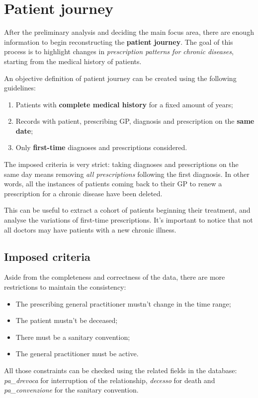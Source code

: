 \chapter{Patient journey}
After the preliminary analysis and deciding the main focus area, there are enough information to begin reconstructing the \textbf{patient journey}. The goal of this process is to highlight changes in \textit{prescription patterns for chronic diseases}, starting from the medical history of patients.

An objective definition of patient journey can be created using the following guidelines:
\begin{enumerate}
	\item Patients with \textbf{complete medical history} for a fixed amount of years;
	\item Records with patient, prescribing GP, diagnosis and prescription on the \textbf{same date};
	\item Only \textbf{first-time }diagnoses and prescriptions considered.
\end{enumerate}

The imposed criteria is very strict: taking diagnoses and prescriptions on the same day means removing \textit{all prescriptions} following the first diagnosis. In other words, all the instances of patients coming back to their GP to renew a prescription for a chronic disease have been deleted.

This can be useful to extract a cohort of patients beginning their treatment, and analyse the variations of first-time prescriptions. It's important to notice that not all doctors may have patients with a new chronic illness.

\section{Imposed criteria}
Aside from the completeness and correctness of the data, there are more restrictions to maintain the consistency:
\begin{itemize}
	\item The prescribing general practitioner mustn't change in the time range;
	\item The patient mustn't be deceased;
	\item There must be a sanitary convention;
	\item The general practitioner must be active.
\end{itemize}

All those constraints can be checked using the related fields in the database: \textit{pa\_drevoca} for interruption of the relationship, \textit{decesso} for death and \textit{pa\_convenzione} for the sanitary convention.

